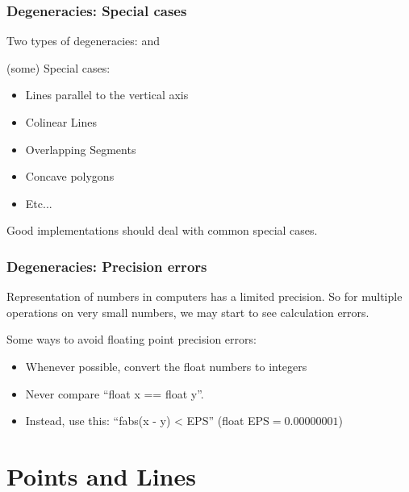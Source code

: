 \documentclass{beamer}
\begin{document}
\begin{frame}
  \frametitle{Degeneracies: Special cases}

  {\smaller
    \begin{block}{}
      Two types of degeneracies:  and
    \end{block}

    \bigskip

    (some) Special cases:
    \begin{itemize}
    \item Lines parallel to the vertical axis
    \item Colinear Lines
    \item Overlapping Segments
    \item Concave polygons
    \item Etc...
    \end{itemize}

    \medskip

    Good implementations should deal with common special cases.
  }
\end{frame}


\begin{frame}
  \frametitle{Degeneracies: Precision errors}

  Representation of  numbers in computers
  has a limited precision. So for multiple operations on very small
  numbers, we may start to see calculation errors.

  \medskip

  Some ways to avoid floating point precision errors:

  \begin{itemize}
  \item Whenever possible, convert the float numbers to integers
  \item Never compare ``float x == float y''. 
  \item Instead, use this: ``fabs(x - y) < EPS'' (float EPS$ = 0.00000001$)
  \end{itemize}

\end{frame}



\section{Points and Lines}
\end{document}
